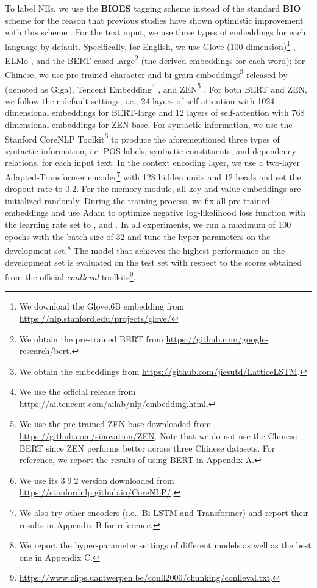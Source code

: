 \documentclass[11pt,a4paper]{article}
\begin{document}
To label NEs, we use the \textbf{BIOES} tagging scheme instead of the standard \textbf{BIO} scheme for the reason that previous studies have shown optimistic improvement with this scheme \cite{DBLP:conf/naacl/LampleBSKD16,DBLP:journals/corr/abs-1911-04474}.
For the text input, 
we use three types of embeddings for each language by default.
Specifically, for English, we use Glove (100-dimension)\footnote{We download the Glove.6B embedding from \url{https://nlp.stanford.edu/projects/glove/}} \cite{DBLP:conf/emnlp/PenningtonSM14}, ELMo \cite{DBLP:conf/naacl/PetersNIGCLZ18}, and the BERT-cased large\footnote{We obtain the pre-trained BERT from \url{https://github.com/google-research/bert}.} \cite{DBLP:conf/naacl/DevlinCLT19} (the derived embeddings for each word);
for Chinese, we use pre-trained character and bi-gram embeddings\footnote{We obtain the embeddings from \url{https://github.com/jiesutd/LatticeLSTM}.} released by \citet{DBLP:conf/acl/ZhangY18} (denoted as Giga), Tencent Embedding\footnote{We use the official release from \url{https://ai.tencent.com/ailab/nlp/embedding.html}.} \cite{DBLP:conf/naacl/SongSLZ18}, and ZEN\footnote{We use the pre-trained ZEN-base downloaded from \url{https://github.com/sinovation/ZEN}. Note that we do not use the Chinese BERT since ZEN performs better across three Chinese datasets. For reference, we report the results of using BERT in Appendix A.} \cite{DBLP:journals/corr/zen}.
For both BERT and ZEN, we follow their default settings, i.e., 24 layers of self-attention with 1024 dimensional embeddings for BERT-large and 12 layers of self-attention with 768 dimensional embeddings for ZEN-base.
For syntactic information, we use the Stanford CoreNLP Toolkit\footnote{We use its 3.9.2 version downloaded from \url{https://stanfordnlp.github.io/CoreNLP/}.} \cite{DBLP:conf/acl/ManningSBFBM14} to produce the aforementioned three types of syntactic information, i.e. POS labels, syntactic constituents, and dependency relations, for each input text.
In the context encoding layer, we use a two-layer Adapted-Transformer encoder\footnote{We also try other encoders (i.e., Bi-LSTM and Transformer) and report their results in Appendix B for reference.} with 128 hidden units and 12 heads and set the dropout rate to 0.2.
For the memory module, all key and value embeddings are initialized randomly.
During the training process, we fix all pre-trained embeddings and use Adam \cite{DBLP:journals/corr/KingmaB14} to optimize negative log-likelihood loss function with the learning rate set to ,  and . 
In all experiments, we run a maximum of 100 epochs with the batch size of 32 and tune the hyper-parameters on the development set.\footnote{We report the hyper-parameter settings of different models as well as the best one in Appendix C.}
The model that achieves the highest performance on the development set is evaluated on the test set with respect to the  scores obtained from the official \textit{conlleval} toolkits\footnote{\url{https://www.clips.uantwerpen.be/conll2000/chunking/conlleval.txt}.}.
\end{document}
